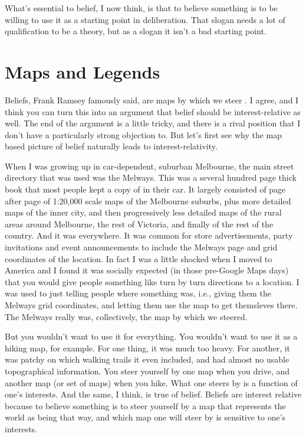 \documentclass[11pt,]{book}
\begin{document}
What's essential to belief, I now think, is that to believe something is to be willing to use it as a starting point in deliberation. That slogan needs a lot of qualification to be a theory, but as a slogan it isn't a bad starting point.

\hypertarget{mapslegends}{%
\section{Maps and Legends}\label{mapslegends}}

Beliefs, Frank Ramsey famously said, are maps by which we steer \citep[146]{RamseyGeneralProp}. I agree, and I think you can turn this into an argument that belief should be interest-relative as well. The end of the argument is a little tricky, and there is a rival position that I don't have a particularly strong objection to. But let's first see why the map based picture of belief naturally leads to interest-relativity.

When I was growing up in car-dependent, suburban Melbourne, the main street directory that was used was the Melways. This was a several hundred page thick book that most people kept a copy of in their car. It largely consisted of page after page of 1:20,000 scale maps of the Melbourne suburbs, plus more detailed maps of the inner city, and then progressively less detailed maps of the rural areas around Melbourne, the rest of Victoria, and finally of the rest of the country. And it was everywhere. It was common for store advertisements, party invitations and event announcements to include the Melways page and grid coordinates of the location. In fact I was a little shocked when I moved to America and I found it was socially expected (in those pre-Google Maps days) that you would give people something like turn by turn directions to a location. I was used to just telling people where something was, i.e., giving them the Melways grid coordinates, and letting them use the map to get themsleves there. The Melways really was, collectively, the map by which we steered.

But you wouldn't want to use it for everything. You wouldn't want to use it as a hiking map, for example. For one thing, it was much too heavy. For another, it was patchy on which walking trails it even included, and had almost no usable topographical information. You steer yourself by one map when you drive, and another map (or set of maps) when you hike. What one steers by is a function of one's interests. And the same, I think, is true of belief. Beliefs are interest relative because to believe something is to steer yourself by a map that represents the world as being that way, and which map one will steer by is sensitive to one's interests.
\end{document}
